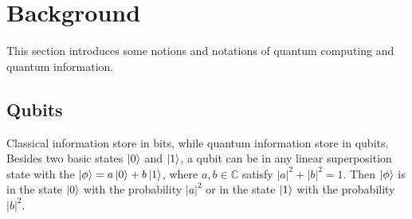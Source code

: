 \documentclass[runningheads]{llncs}
\begin{document}
\section{Background}
\label{Background}
This section introduces some notions and notations of quantum computing and quantum information.

\subsection{Qubits}
Classical information store in bits, while quantum information store in qubits. 
Besides two basic states $\left\vert{0}\right\rangle$ and $\left\vert{1}\right\rangle$,
a qubit can be in any linear superposition state with the $\left\vert{\phi}\right\rangle=a\left\vert{0}\right\rangle+b\left\vert{1}\right\rangle$,
where $a,b\in \mathbb{C}$ satisfy $|a|^{2}+|b|^{2}=1$.
Then $\left\vert{\phi}\right\rangle$ is in the state $\left\vert{0}\right\rangle$ with the probability $|a|^{2}$ or in the state $\left\vert{1}\right\rangle$ with the probability $|b|^{2}$.
\end{document}
